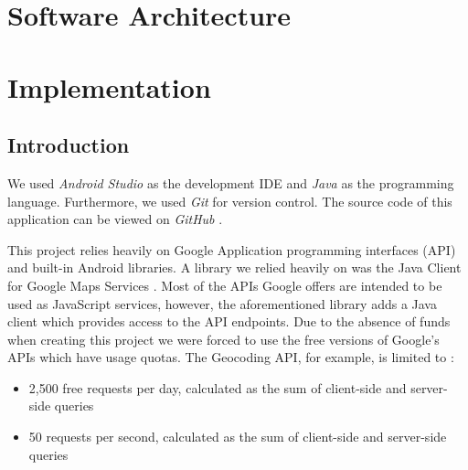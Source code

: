 \documentclass[12p]{article}
\begin{document}
    		
    	\newpage
    	\section{Software Architecture}

		    
		\newpage
		\section{Implementation} \label{sec:Implementation}
		
		    \subsection{Introduction}
		    We used \textit{Android Studio} as the development IDE and \textit{Java} as the programming language. Furthermore, we used \textit{Git} for version control. The source code of this application can be viewed on \textit{GitHub} \cite{repo}.
		    
		    This project relies heavily on Google Application programming interfaces (API) \cite{GoogleDevProducts} and built-in Android libraries. A library we relied heavily on was the Java Client for Google Maps Services \cite{JavaGoogleAPI}. Most of the APIs Google offers are intended to be used as JavaScript services, however, the aforementioned library adds a Java client which provides access to the API endpoints.
            Due to the absence of funds when creating this project we were forced to use the free versions of Google's APIs which have usage quotas. The Geocoding API, for example, is limited to
            \cite{GeoCodingAPILimits}:
            
            \begin{itemize}
                \item 2,500 free requests per day, calculated as the sum of client-side and server-side queries
                \item 50 requests per second, calculated as the sum of client-side and server-side queries
            \end{itemize}
            
\end{document}
